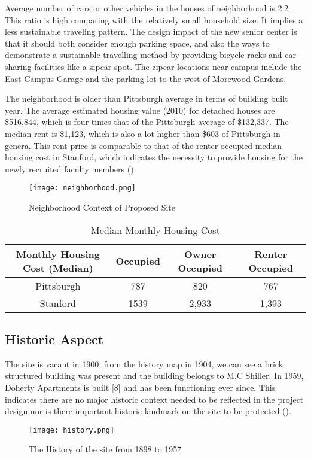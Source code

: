 Average number of cars or other vehicles in the houses of neighborhood
is 2.2~\cite{neighborhood}. This ratio is high comparing with the
relatively small household size. It implies a less sustainable
traveling pattern. The design impact of the new senior center is that
it should both consider enough parking space, and also the ways to
demonstrate a sustainable travelling method by providing bicycle racks
and car-sharing facilities like a zipcar spot. The zipcar locations
near campus include the East Campus Garage and the parking lot to the
west of Morewood Gardens. 

The neighborhood is older than Pittsburgh average in terms of building
built year. The average estimated housing value (2010) for detached
houses are \$516,844, which is four times that of the Pittsburgh
average of \$132,337. The median rent is \$1,123, which is also a lot
higher than \$603 of Pittsburgh in genera. This rent price is
comparable to that of the renter occupied median housing cost in
Stanford, which indicates the necessity to provide housing for the
newly recruited faculty members (). 
\begin{figure}[htbp]
  \centering
  \texttt{[image: neighborhood.png]}
  \caption[Neighborhood]{Neighborhood Context of Proposed
    Site~\cite{neighborhood}}
  \label{fig:neighborhood}
\end{figure}

\begin{table}
  \begin{tabular}{c | c c c}
    \toprule
    Monthly Housing Cost (Median)	&Occupied	&Owner Occupied	&Renter Occupied\\
    \midrule
    Pittsburgh	&787	&820	&767\\
    Stanford	&1539	&2,933	&1,393\\
    \bottomrule
  \end{tabular}
  \caption{Median Monthly Housing Cost}
  \label{tab:midHousingcost}
\end{table}
\begin{comment}
\end{comment}
\subsection{Historic Aspect}
The site is vacant in 1900, from the history map in 1904, we can see a
brick structured building was present and the building belongs to M.C
Shiller. In 1959, Doherty Apartments is built [8] and has been
functioning ever since. This indicates there are no major historic
context needed to be reflected in the project design nor is there
important historic landmark on the site to be protected
().
\begin{figure}[htbp]
  \centering
  \texttt{[image: history.png]}
  \caption[History of Site]{The History of the site from 1898 to 1957}
  \label{fig:history}
\end{figure}


